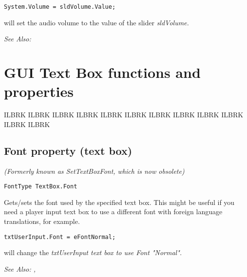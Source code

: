 \begin{verbatim}
System.Volume = sldVolume.Value;
\end{verbatim}
will set the audio volume to the value of the slider \it{sldVolume}.

\it{See Also:} 



\section{GUI Text Box functions and properties}%

ILBRK
ILBRK
ILBRK
ILBRK
ILBRK
ILBRK
ILBRK
ILBRK
ILBRK
ILBRK
ILBRK
ILBRK


\subsection{Font property (text box)}\label{TextBox.Font}%

\it{(Formerly known as SetTextBoxFont, which is now obsolete)}

\begin{verbatim}
FontType TextBox.Font
\end{verbatim}

Gets/sets the font used by the specified text box.
This might be useful if you need a player input text box to use a different
font with foreign language translations, for example.

\begin{verbatim}
txtUserInput.Font = eFontNormal;
\end{verbatim}
will change the \it{txtUserInput} text box to use Font "Normal".

\it{See Also:} , 


